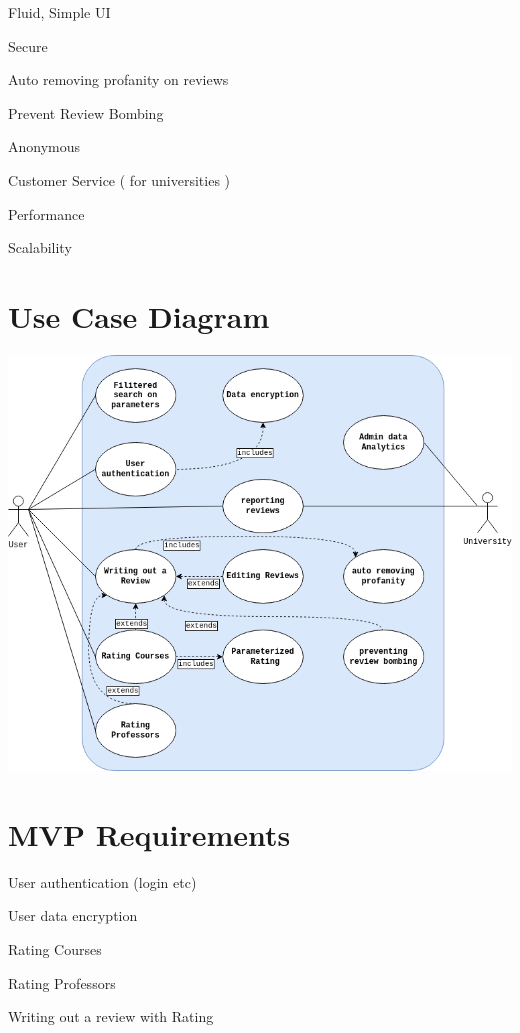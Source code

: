 \documentclass{article}
\begin{document}
	\quad Fluid, Simple UI

	\quad Secure

	\quad Auto removing profanity on reviews

	\quad Prevent Review Bombing

	\quad Anonymous

	\quad Customer Service ( for universities )

	\quad Performance

	\quad Scalability

\section{Use Case Diagram} 

\begin{center}
	\includegraphics[scale=0.5]{../requirements_specification/USECASE.drawio.png}	
\end{center}

\section{MVP Requirements}

	\quad User authentication (login etc)

	\quad User data encryption

	\quad Rating Courses

	\quad Rating Professors

	\quad Writing out a review with Rating
\end{document}
